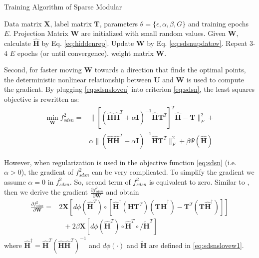 \documentclass[letterpaper]{article}
\begin{document}
\begin{algorithm}[tb]
\caption{Training Algorithm of Sparse Modular}
\begin{algorithmic}[1]
 Data matrix $\textbf{X}$, label matrix $\textbf{T}$, parameters $\theta=\{\epsilon, \alpha, \beta, G \}$ and training epochs $E$.
 Projection Matrix $\textbf{W}$ are initialized with small random values.
\State  Given $\textbf{W}$, calculate $\widehat{\textbf{H}}$ by Eq. \eqref{eq:hiddenrep}.
\State  Update $\textbf{W}$ by Eq. \eqref{eq:sdsnupdataw}.
\State  Repeat 3-4 $E$ epochs (or until convergence).
 weight matrix $\textbf{W}$.
\end{algorithmic}
\label{alg:Trainalgsm}
\vskip -0.05in
\end{algorithm}

Second, for faster moving $\textbf{W}$ towards a direction that finds the optimal points, the deterministic nonlinear relationship between $\textbf{U}$ and $\textbf{W}$ is used to compute the gradient. By plugging \eqref{eq:sdsnsloveu} into criterion \eqref{eq:sdsn}, the least squares objective is rewritten as:
\begin{align}
\min_{\textbf{W}}f^2_{sdsn} = &\|[(\widehat{\textbf{H}}\widehat{\textbf{H}}^T+\alpha \textbf{I})^{-1}\widehat{\textbf{H}}\textbf{T}^T]^T\widehat{\textbf{H}}-\textbf{T}\|^2_F+ \nonumber\\
                             & \alpha\|(\widehat{\textbf{H}}\widehat{\textbf{H}}^T+\alpha \textbf{I})^{-1}\widehat{\textbf{H}}\textbf{T}^T\|^2_F +\beta \Psi(\widehat{\textbf{H}})
\label{eq:sdsnw2}
\end{align}

However, when regularization is used in the objective function \eqref{eq:sdsn} (i.e. $\alpha>0$), the gradient of $f^2_{sdsn}$ can be very complicated.
To simplify the gradient we assume $\alpha=0$ in $f^2_{sdsn}$. So, second term of $f^2_{sdsn}$ is equivalent to zero. Similar to \cite{Deng2011b}, then we derive the gradient $\frac{\partial f^2_{sdsn}}{\partial \textbf{W}}$ and obtain
\begin{align}
\frac{\partial f^2_{sdsn}}{\partial \textbf{W}}= & 2\textbf{X}\left[d\phi(\widehat{\textbf{H}}^T)\circ[\widehat{\textbf{H}}^\dag(\widehat{\textbf{H}}\textbf{T}^T)(\textbf{T}\widehat{\textbf{H}}^\dag)-
\textbf{T}^T(\textbf{T}\widehat{\textbf{H}}^\dag)]\right] \nonumber\\
&\ \ \ + 2\beta\textbf{X}\left[d\phi(\widehat{\textbf{H}}^T)\circ\widehat{\textbf{H}}^T\circ/\widetilde{\textbf{H}}^T\right]
\label{eq:sdsnslovew2}
\end{align}
where $\widehat{\textbf{H}}^\dag=\widehat{\textbf{H}}^T(\widehat{\textbf{H}}\widehat{\textbf{H}}^T)^{-1}$ and $d\phi(\cdot)$ and $\widetilde{\textbf{H}}$ are defined in \eqref{eq:sdsnslovew1}.
\end{document}
